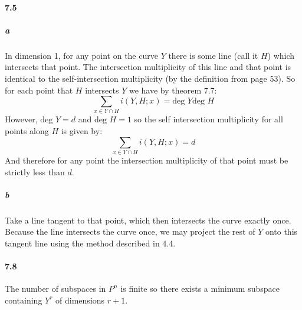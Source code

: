 \documentclass{article}
\begin{document}
\paragraph{7.5}

\subparagraph{a}

In dimension 1, for any point on the curve $Y$ there is some line (call it $H$) which intersects that point.  The intersection multiplicity of this line and that point is identical to the self-intersection multiplicity (by the definition from page 53).  So for each point that $H$ intersects $Y$ we have by theorem 7.7:
\[ \sum \limits_{x \in Y \cap H} i(Y, H ; x) = \textrm{deg } Y  \textrm{deg } H \]
However, $\textrm{deg } Y = d$ and $\textrm{deg } H = 1$ so the self intersection multiplicity for all points along $H$ is given by:
\[ \sum \limits_{x \in Y \cap H} i(Y, H ; x) = d \]
And therefore for any point the intersection multiplicity of that point must be strictly less than $d$.

\subparagraph{b}
Take a line tangent to that point, which then intersects the curve exactly once.  Because the line intersects the curve once, we may project the rest of $Y$ onto this tangent line using the method described in 4.4.


\paragraph{7.8}
The number of subspaces in $P^n$ is finite so there exists a minimum subspace containing $Y^r$ of dimensions $r+1$.
\end{document}
